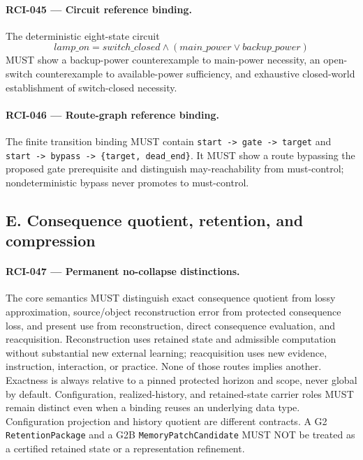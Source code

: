 \documentclass[11pt]{article}
\begin{document}
\paragraph{RCI-045 --- Circuit reference binding.}
The deterministic eight-state circuit
\[
 lamp\_on = switch\_closed \land (main\_power \lor backup\_power)
\]
MUST show a backup-power counterexample to main-power necessity, an open-switch
counterexample to available-power sufficiency, and exhaustive closed-world
establishment of switch-closed necessity.

\paragraph{RCI-046 --- Route-graph reference binding.}
The finite transition binding MUST contain
\texttt{start -> gate -> target} and
\texttt{start -> bypass -> \{target, dead\_end\}}. It MUST show a route
bypassing the proposed gate prerequisite and distinguish may-reachability from
must-control; nondeterministic bypass never promotes to must-control.

\subsection{E. Consequence quotient, retention, and compression}

\paragraph{RCI-047 --- Permanent no-collapse distinctions.}
The core semantics MUST distinguish exact consequence quotient from lossy
approximation, source/object reconstruction error from protected consequence
loss, and present use from reconstruction, direct consequence evaluation, and
reacquisition. Reconstruction uses retained state and admissible computation
without substantial new external learning; reacquisition uses new evidence,
instruction, interaction, or practice. None of those routes implies another.
Exactness is always relative to a pinned protected horizon and scope, never
global by default.
Configuration, realized-history, and retained-state carrier roles MUST remain
distinct even when a binding reuses an underlying data type. Configuration
projection and history quotient are different contracts. A G2
\texttt{RetentionPackage} and a G2B \texttt{MemoryPatchCandidate} MUST NOT be
treated as a certified retained state or a representation refinement.
\end{document}
